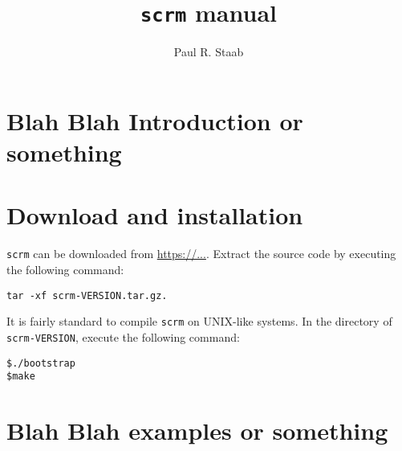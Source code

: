 \documentclass{article}
\title{{\tt scrm} manual}
\author{Paul R. Staab}
\newcommand{\cm}[1]{\begin{center}{\tt #1}\end{center}}
\begin{document}
\maketitle

\section{Blah Blah Introduction or something}

\section{Download and installation}
{\tt scrm} can be downloaded from \url{https://...}. Extract the source code by executing the following command:
\cm{tar -xf scrm-VERSION.tar.gz.}

It is fairly standard to compile {\tt scrm} on UNIX-like systems. In the directory of {\tt scrm-VERSION}, execute the following command:
\begin{verbatim}
$./bootstrap
$make
\end{verbatim}

\section{Blah Blah examples or something}
\nocite{mcvean_approximating_2005}



\end{document}
